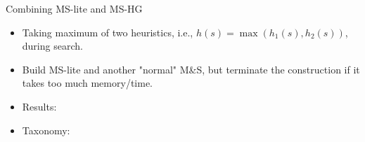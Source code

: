 \begin{myblock}{Combining MS-lite and MS-HG}
\Large
\begin{itemize}
\item Taking maximum of two heuristics, i.e., $h(s)=\max(h_1(s), h_2(s))$, during search.
\item Build MS-lite and another "normal" M\&S, but terminate the construction if it takes too much memory/time.
\end{itemize}


\begin{minipage}{0.45\textwidth}
\begin{itemize}
\item Results:
\end{itemize}
\end{minipage}
\begin{minipage}{0.45\textwidth}
\begin{itemize}
\item Taxonomy:
\end{itemize}
\end{minipage}


\end{myblock}
